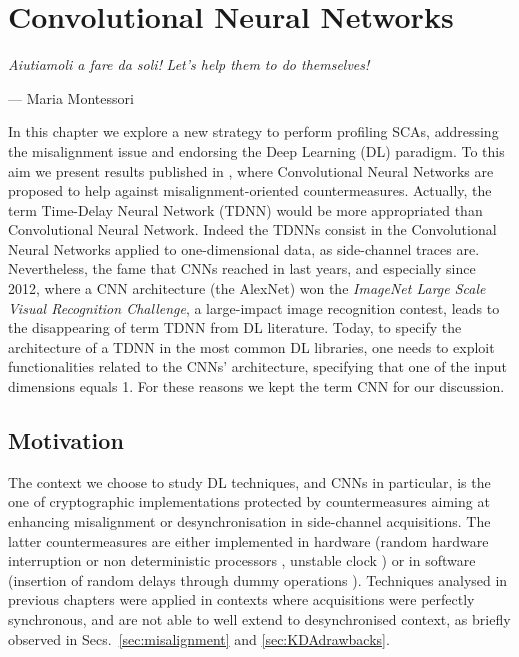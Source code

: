 
\chapter{Convolutional Neural Networks} %
\label{ChapterCNN}
\setlength{\epigraphwidth}{0.3\textwidth}

\epigraph{\textit{Aiutiamoli a fare da soli!}\newline
\footnotesize{\textit{Let's help them to do themselves!}}}{--- \textup{Maria Montessori}}


In this chapter we explore a new strategy to perform profiling SCAs, addressing the misalignment issue and endorsing the Deep Learning (DL) paradigm. To this aim we present results published in \cite{DBLP:conf/ches/CagliDP17}, where Convolutional Neural Networks are proposed to help against misalignment-oriented countermeasures. Actually, the term Time-Delay Neural Network (TDNN) would be more appropriated than Convolutional Neural Network. Indeed the TDNNs  \cite{lang1990time} consist in the Convolutional Neural Networks applied to one-dimensional data, as side-channel traces are. Nevertheless, the fame that CNNs reached in last years, and especially since 2012, where a CNN architecture (the \textquotedbl AlexNet\textquotedbl) \cite{KSH12}  won the \emph{ImageNet Large Scale Visual Recognition Challenge}, a large-impact image recognition contest, leads to the disappearing of term TDNN from DL literature. Today, to specify the architecture of a TDNN in the most common DL libraries, one needs to exploit functionalities related to the CNNs' architecture, specifying \eg that one of the input dimensions equals 1. For these reasons we kept the term CNN for our discussion. 

\section{Motivation}
The context we choose to study DL techniques, and CNNs in particular, is the one of cryptographic implementations protected by countermeasures aiming at enhancing misalignment or desynchronisation in side-channel acquisitions. The latter countermeasures are either implemented in hardware (\eg random hardware interruption or non deterministic processors \cite{irwin2002instruction,may2001non}, unstable clock \cite{moore2002improving,moore2003balanced}) or in software (\eg insertion of random delays through dummy operations \cite{coron2009efficient,coron2010analysis}). Techniques analysed in previous chapters were applied in contexts where acquisitions were perfectly synchronous, and are not able to well extend to desynchronised context, as briefly observed in Secs.~\ref{sec:misalignment} and \ref{sec:KDAdrawbacks}.\\

